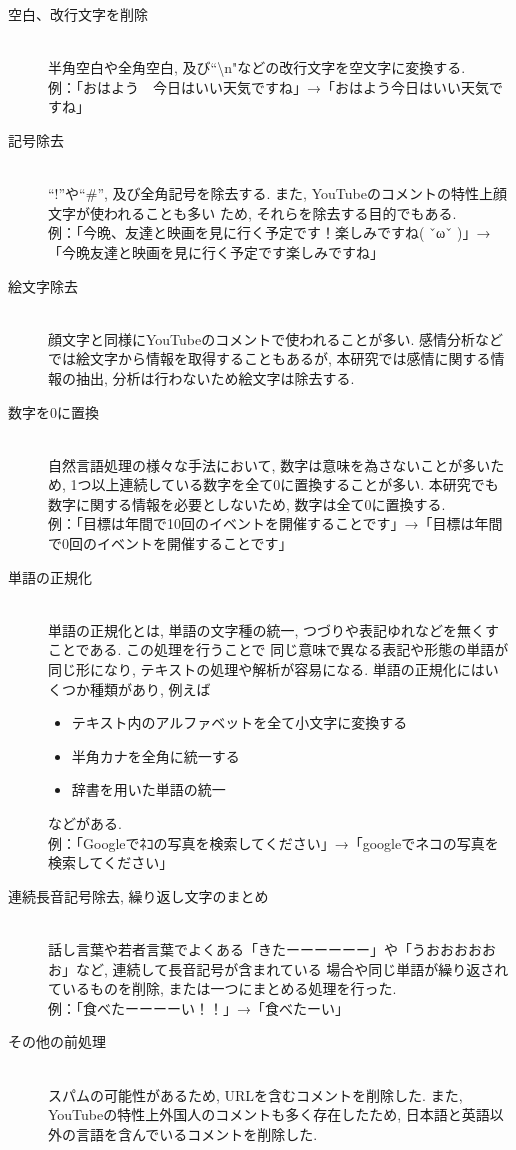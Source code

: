 \documentclass{ltjarticle}
\begin{document}
\begin{description}
    \item[空白、改行文字を削除]\mbox{}\\
    半角空白や全角空白, 及び``\textbackslash n"などの改行文字を空文字に変換する.\\
    例：「おはよう　今日はいい天気ですね」→「おはよう今日はいい天気ですね」
    \item[記号除去]\mbox{}\\
    ``!''や``\#'', 及び全角記号を除去する. また, YouTubeのコメントの特性上顔文字が使われることも多い
    ため, それらを除去する目的でもある. \\
    例：「今晩、友達と映画を見に行く予定です！楽しみですね( ˇωˇ )」→「今晩友達と映画を見に行く予定です楽しみですね」
    \item[絵文字除去]\mbox{}\\
    顔文字と同様にYouTubeのコメントで使われることが多い. 感情分析などでは絵文字から情報を取得することもあるが, 
    本研究では感情に関する情報の抽出, 分析は行わないため絵文字は除去する. 
    \item[数字を0に置換]\mbox{}\\
    自然言語処理の様々な手法において, 数字は意味を為さないことが多いため, 
    1つ以上連続している数字を全て0に置換することが多い. 本研究でも数字に関する情報を必要としないため, 
    数字は全て0に置換する. \\
    例：「目標は年間で10回のイベントを開催することです」→「目標は年間で0回のイベントを開催することです」
    \item[単語の正規化]\mbox{}\\
    単語の正規化とは, 単語の文字種の統一, つづりや表記ゆれなどを無くすことである. この処理を行うことで
    同じ意味で異なる表記や形態の単語が同じ形になり, テキストの処理や解析が容易になる. 
    単語の正規化にはいくつか種類があり, 例えば
    \begin{itemize}
        \item テキスト内のアルファベットを全て小文字に変換する
        \item 半角カナを全角に統一する
        \item 辞書を用いた単語の統一
    \end{itemize}
    などがある. \\
    例：「Googleでﾈｺの写真を検索してください」→「googleでネコの写真を検索してください」
    \newpage
    \item[連続長音記号除去, 繰り返し文字のまとめ]\mbox{}\\
    話し言葉や若者言葉でよくある「きたーーーーーー」や「うおおおおおお」など, 連続して長音記号が含まれている
    場合や同じ単語が繰り返されているものを削除, または一つにまとめる処理を行った. \\
    例：「食べたーーーーい！！」→「食べたーい」
    \item[その他の前処理]\mbox{}\\
    スパムの可能性があるため, URLを含むコメントを削除した. また, YouTubeの特性上外国人のコメントも多く存在したため, 
    日本語と英語以外の言語を含んでいるコメントを削除した. 
\end{description}
\end{document}
